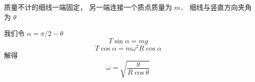
\begin{issues}
\issueDraft
\end{issues}



质量不计的细线一端固定， 另一端连接一个质点质量为 $m$． 细线与竖直方向夹角为 $\theta$

我们令 $\alpha = \pi/2 - \theta$
\begin{equation}
T\sin\alpha = mg
\end{equation}
\begin{equation}
T\cos\alpha = m\omega^2 R\cos\alpha
\end{equation}
解得
\begin{equation}
\omega = \sqrt{\frac{g}{R\cos\theta}}
\end{equation}
